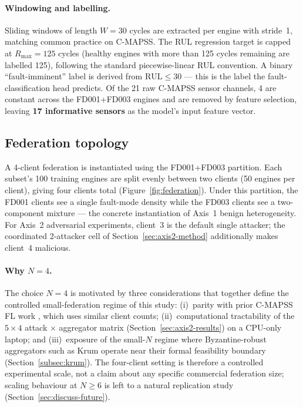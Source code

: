 \documentclass[preprint,12pt,authoryear]{elsarticle}
\begin{document}
\paragraph{Windowing and labelling.}
Sliding windows of length $W = 30$ cycles are extracted per engine
with stride~1, matching common practice on C-MAPSS. The RUL
regression target is capped at $R_{\max} = 125$ cycles (healthy
engines with more than 125 cycles remaining are labelled 125),
following the standard piecewise-linear RUL convention. A binary
``fault-imminent'' label is derived from $\text{RUL} \leq 30$ ---
this is the label the fault-classification head predicts. Of the 21
raw C-MAPSS sensor channels, 4 are constant across the FD001+FD003
engines and are removed by feature selection, leaving
\textbf{17 informative sensors} as the model's input feature vector.

\subsection{Federation topology}
\label{subsec:federation}

A 4-client federation is instantiated using the FD001+FD003
partition. Each subset's 100 training engines are split evenly
between two clients (50 engines per client), giving four clients
total (Figure~\ref{fig:federation}). Under this partition, the
FD001 clients see a single fault-mode density while the FD003
clients see a two-component mixture --- the concrete instantiation
of Axis~1 benign heterogeneity. For Axis~2 adversarial experiments,
client~3 is the default single attacker; the coordinated 2-attacker
cell of Section~\ref{sec:axis2-method} additionally makes client~4
malicious.

\paragraph{Why $N = 4$.}
The choice $N = 4$ is motivated by three considerations that
together define the controlled small-federation regime of this
study: (i)~parity with prior C-MAPSS FL work
\citep{Barbosa2025FLJetEngines, Vermelin2024CollabFLRUL,
Pandhare2021FederatedBaseline}, which uses similar client counts;
(ii)~computational tractability of the $5 \times 4$ attack $\times$
aggregator matrix (Section~\ref{sec:axis2-results}) on a
CPU-only laptop; and (iii)~exposure of the small-$N$ regime where
Byzantine-robust aggregators such as Krum operate near their
formal feasibility boundary (Section~\ref{subsec:krum}). The
four-client setting is therefore a controlled experimental scale,
not a claim about any specific commercial federation size;
scaling behaviour at $N \geq 6$ is left to a natural replication
study (Section~\ref{sec:discuss-future}).
\end{document}
